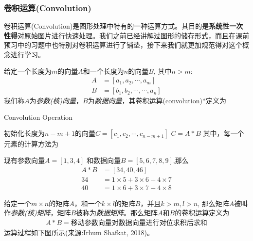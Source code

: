 \documentclass[12pt]{article}
\numberwithin{equation}{section}
\numberwithin{figure}{section}
\begin{document}
\subsubsection{卷积运算(Convolution)}

卷积运算(Convolution)是图形处理中特有的一种运算方式。其目的是\textbf{系统性一次性得}对原始图片进行快速处理。我们之前已经讲解过图形的储存形式，而且在课前预习中的习题中也特别对卷积运算进行了铺垫，接下来我们就更加规范得对这个概念进行学习。

\begin{definition}
	给定一个长度为$m$的向量$A$和一个长度为$n$的向量$B$, 其中$n > m$:
	\begin{align*}
		A & = [a_1, a_2, \cdots, a_m ] \\
		B & = [b_1, b_2, \cdots, \cdots, a_n]
	\end{align*}
	我们称$A$为\textit{参数(核)向量}，$B$为\textit{数据向量}，其卷积运算(convolution)$*$定义为
	
	\begin{algorithm}[H]
	\SetAlgoLined
	\caption{Convolution Operation}
	初始化长度为$n-m+1$的向量$C = [c_1, c_2, \cdots, c_{n-m+1}]$ \;
	$C = A * B $ \; 其中，每一个元素的计算方法为\;
	\end{algorithm}
\end{definition}

\begin{example}
	现有参数向量$A=[1, 3, 4]$ 和数据向量$B = [5, 6, 7 , 8 , 9]$,那么
	\begin{align*}
		A * B & = [34, 40, 46]\\
		34 & = 1\times 5 + 3 \times 6 + 4 \times 7 \\
		40 & = 1 \times 6 + 3 \times 7 + 4 \times 8 
	\end{align*}
\end{example}

\begin{definition}
	给定一个$m \times n$的矩阵$A$，和一个$k \times l$的矩阵$B$，并且$k > m, l > n$, 那么矩阵$A$被叫作\textit{参数(核)矩阵}，矩阵$B$被称为\textit{数据矩阵}。那么矩阵$A$和$B$的卷积运算定义为
	\begin{align*}
		A * B = \text{移动参数向量对数据向量进行对位求积后求和}
	\end{align*}
	运算过程如下图所示(来源:Irhum Shafkat, 2018)。
\end{definition}
\end{document}
